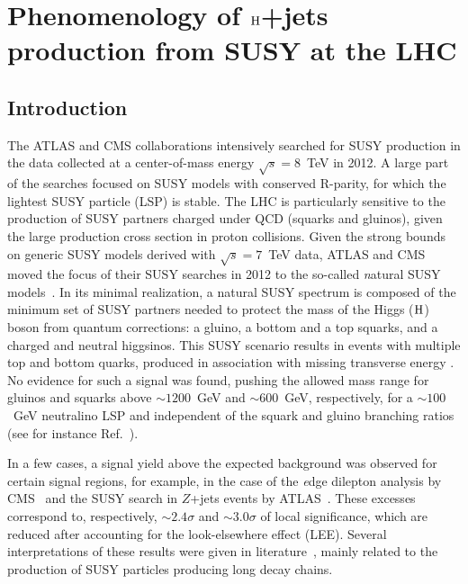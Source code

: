 \chapter{Phenomenology of $\mathrm{H}$+jets production from SUSY at the LHC}
\label{ch:pheno}
\section{Introduction}
The ATLAS and CMS collaborations intensively searched for SUSY production in the data collected at a center-of-mass energy $\sqrt{s}=8$~TeV in 2012. A large part of the searches focused on SUSY models with conserved R-parity, for which the lightest SUSY particle (LSP) is stable. The LHC is particularly sensitive to the production of SUSY partners charged under QCD (squarks and gluinos), given the large production cross section in proton collisions. Given the strong bounds on generic SUSY models derived with $\sqrt{s}=7$~TeV data, ATLAS and CMS moved the focus of their SUSY searches in 2012 to the so-called {\textit natural} SUSY models~\cite{Papucci:2011wy}. In its minimal realization, a natural SUSY spectrum is composed of the minimum set of SUSY partners needed to protect the mass of the Higgs ($\mathrm{H}$) boson from quantum corrections: a gluino, a bottom and a top squarks, and a charged and neutral higgsinos. This SUSY scenario results in events with multiple top and bottom quarks, produced in association with missing transverse energy \met. No evidence for such a signal was found, pushing the allowed mass range for gluinos and squarks above $\sim 1200$~GeV and $\sim 600$~GeV, respectively, for a $\sim 100$~GeV neutralino LSP and independent of the squark and gluino branching ratios (see for instance Ref.~\cite{razor8TeVPRD}). 

In a few cases, a signal yield above the expected background was observed for certain signal regions, for example, in the case of the {\textit edge} dilepton analysis by CMS~\cite{CMSedge} and the SUSY search in $Z$+jets events by ATLAS~\cite{ATLASZpeak}. These excesses correspond to, respectively, $\sim 2.4\sigma$ and $\sim 3.0\sigma$ of local significance, which are reduced after accounting for the look-elsewhere effect (LEE). Several interpretations of these results were given in literature~\cite{Theory1,Theory2,Theory3,Theory4,Theory5,Theory6}, mainly related to the production of SUSY particles producing long decay chains. 

